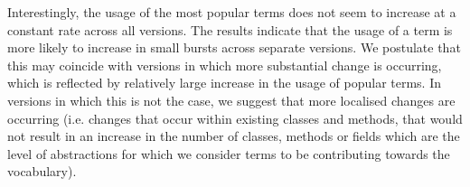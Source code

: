 Interestingly, the usage of the most popular terms does not seem to increase at a constant rate across all versions. The results indicate that the usage of a term is more likely to increase in small bursts across separate versions. We postulate that this may coincide with versions in which more substantial change is occurring, which is reflected by relatively large increase in the usage of popular terms. In versions in which this is not the case, we suggest that more localised changes are occurring (i.e. changes that occur within existing classes and methods, that would not result in an increase in the number of classes, methods or fields which are the level of abstractions for which we consider terms to be contributing towards the vocabulary).


